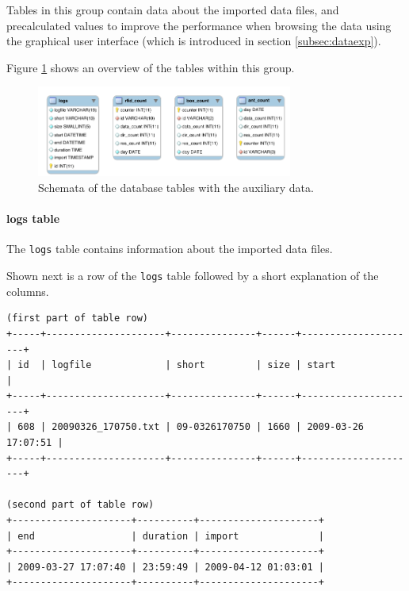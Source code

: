 Tables in this group contain data about the imported data files, and precalculated values to improve the performance when browsing the data using the graphical user interface (which is introduced in section \ref{subsec:dataexp}).

Figure \ref{fig:auxiliary_tables} shows an overview of the tables within this group. 


\begin{figure}[htpb]
\begin{center}
  \includegraphics[width=0.75\textwidth]{assets/pdf/auxiliary_tables_schema.pdf}
  \caption[Schema of database tables with system member data]{Schemata of the database tables with the auxiliary data.}
  \label{fig:auxiliary_tables}
\end{center}
\end{figure}

\paragraph{logs table}
\label{para:logs_table} 

The \lstinline|logs| table contains information about the imported data files.

Shown next is a row of the \lstinline|logs| table followed by a short explanation of the columns.

\codescript
{}
\begin{lstlisting}[frame=none]
(first part of table row)
+-----+---------------------+---------------+------+---------------------+
| id  | logfile             | short         | size | start               |
+-----+---------------------+---------------+------+---------------------+
| 608 | 20090326_170750.txt | 09-0326170750 | 1660 | 2009-03-26 17:07:51 |
+-----+---------------------+---------------+------+---------------------+

(second part of table row)
+---------------------+----------+---------------------+
| end                 | duration | import              |
+---------------------+----------+---------------------+
| 2009-03-27 17:07:40 | 23:59:49 | 2009-04-12 01:03:01 | 
+---------------------+----------+---------------------+

\end{lstlisting}


